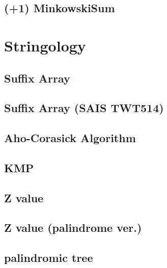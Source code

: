 \documentclass[10pt,twocolumn,oneside]{article}
\begin{document}
\subsection{(+1) MinkowskiSum}


\newpage

\section{Stringology}
\subsection{Suffix Array}


\newpage

\subsection{Suffix Array (SAIS TWT514)}


\newpage

\subsection{Aho-Corasick Algorithm}


\subsection{KMP}


\subsection{Z value}


\subsection{Z value (palindrome ver.)}


\subsection{palindromic tree}

\end{document}
